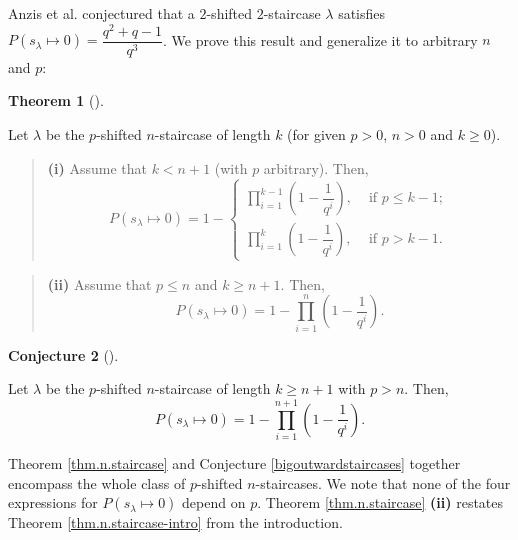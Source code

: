 \documentclass[numbers=enddot,12pt,final,onecolumn,notitlepage]{scrartcl}%
\theoremstyle{definition}
\newtheorem{theo}{Theorem}[section]
\newenvironment{theorem}[1][]
{\begin{theo}[#1]\begin{leftbar}}
{\end{leftbar}\end{theo}}
\newtheorem{conj}[theo]{Conjecture}
\newenvironment{conjecture}[1][]
{\begin{conj}[#1]\begin{leftbar}}
{\end{leftbar}\end{conj}}
\newenvironment{statement}{\begin{quote}}{\end{quote}}
\let\prodnonlimits\prod
\renewcommand{\prod}{\prodnonlimits\limits}
\renewcommand{\leq}{\leqslant}
\renewcommand{\geq}{\geqslant}
\theoremstyle{plainsl}
\begin{document}
Anzis et al. \cite{Anzis18} conjectured that a $2$-shifted $2$-staircase $\lambda$ satisfies $P(s_{\lambda} \mapsto 0) = \dfrac{q^2+q -1}{q^3}$. We prove this result and generalize it to arbitrary $n$ and $p$:

\begin{theorem}
\label{thm.n.staircase}

Let $\lambda$ be the $p$-shifted $n$-staircase of
length $k$ (for given $p > 0$, $n > 0$ and $k \geq 0$).

\begin{statement}
\textbf{(i)} Assume that $k < n+1$ (with $p$ arbitrary). Then,
\[
P(s_{\lambda} \mapsto 0) =
1 -
\begin{cases}
\prod_{i=1}^{k-1} \left(  1-\dfrac{1}{q^{i}}\right) ,
& \text{ if } p \leq k-1; \\
\prod_{i=1}^{k} \left(  1-\dfrac{1}{q^{i}}\right) ,
& \text{ if } p > k-1.
\end{cases}
\]
\end{statement}

\begin{statement}
\textbf{(ii)} Assume that $p \leq n$ and $k \geq n+1$. Then,
\[
P(s_{\lambda} \mapsto 0) = 1- \prod_{i=1}^{n} \left(  1-\dfrac{1}{q^{i}}\right) .
\]
\end{statement}
\end{theorem}

\begin{conjecture}
\label{bigoutwardstaircases}
Let $\lambda$ be the $p$-shifted $n$-staircase of length
$k \geq n+1$ with $p > n$.  Then,
\[
P(s_{\lambda} \mapsto 0) = 1-\prod_{i=1}^{n+1} \left(  1-\dfrac{1}{q^{i}}\right).
\]
\end{conjecture}


Theorem \ref{thm.n.staircase} and Conjecture \ref{bigoutwardstaircases} together encompass the whole class of $p$-shifted $n$-staircases. We note that none of the four expressions for $P(s_{\lambda} \mapsto 0)$ depend on $p$.
Theorem \ref{thm.n.staircase} \textbf{(ii)} restates Theorem \ref{thm.n.staircase-intro} from the introduction.
\end{document}
